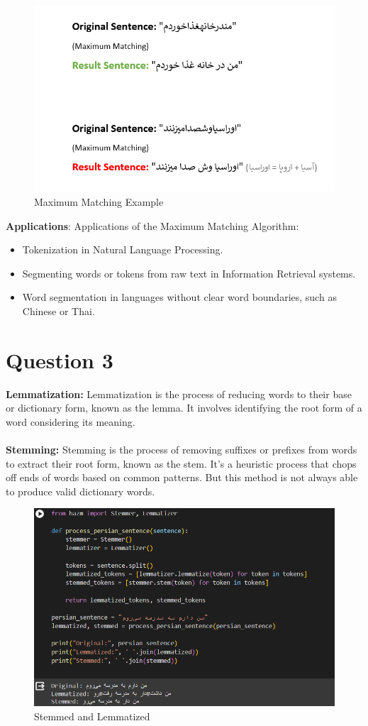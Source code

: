 \documentclass{article}
\begin{document}
\begin{figure}[h]
  \centering
  \includegraphics[width=1\textwidth]{Images/MaxMatch.png}
  \caption{Maximum Matching Example}
  \label{fig:model_diagram}
\end{figure}

\textbf{Applications}: Applications of the Maximum Matching Algorithm:
\begin{itemize}
  \item Tokenization in Natural Language Processing.
  \item Segmenting words or tokens from raw text in Information Retrieval systems.
  \item Word segmentation in languages without clear word boundaries, such as Chinese or Thai.
\end{itemize}

\pagebreak

\section{Question 3}
\textbf{Lemmatization:} Lemmatization is the process of reducing words to their base or dictionary form, known as the lemma. It involves identifying the root form of a word considering its meaning. \\\\
\textbf{Stemming:} Stemming is the process of removing suffixes or prefixes from words to extract their root form, known as the stem. It's a heuristic process that chops off ends of words based on common patterns. But this method is not always able to produce valid dictionary words.

\begin{figure}[h]
  \centering
  \includegraphics[width=1\textwidth]{Images/Stem_Lemma.png}
  \caption{Stemmed and Lemmatized}
  \label{fig:model_diagram}
\end{figure}
\end{document}
